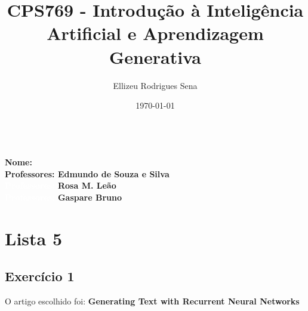 \documentclass[a4paper,12pt,fleqn]{article}
\title{CPS769 - Introdução à Inteligência Artificial e Aprendizagem Generativa}
\author{Ellizeu Rodrigues Sena}
\date{\today}
\renewcommand{\maketitle}{%
  \noindent\textbf{\thetitle}\\
  \textbf{Nome: \theauthor}\\
  \textbf{Professores: Edmundo de Souza e Silva}\\
  \textbf{\textcolor{white}{Professores:} Rosa M. Leão}\\
  \textbf{\textcolor{white}{Professores:} Gaspare Bruno}\\
}
\begin{document}
  \maketitle

  \section*{Lista 5}

    \subsection*{Exercício 1}
    O artigo escolhido foi: \textbf{Generating Text with Recurrent Neural Networks}
    
\end{document}
